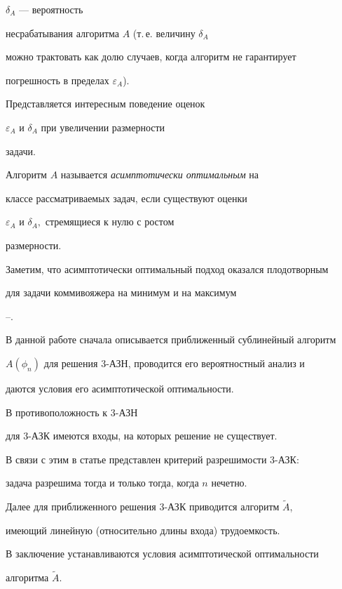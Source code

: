 $\delta_{A}$ --- вероятность 


несрабатывания алгоритма ${A}$ (т.\,е. величину $\delta_{ A}$ 


можно трактовать как долю случаев, когда алгоритм не гарантирует 


погрешность в пределах $\varepsilon_{ A} $).





Представляется интересным поведение оценок 


$\varepsilon_{ A}$ и $\delta_{A}$ при увеличении размерности 


задачи.





Алгоритм ${A}$ называется {\em асимптотически оптимальным} на


классе рассматриваемых задач, если существуют оценки


$\varepsilon_{ A} $ и $\delta_{ A}, $ стремящиеся к нулю с ростом


размерности.


Заметим, что асимптотически оптимальный подход оказался плодотворным


для задачи коммивояжера на минимум и на максимум 


\cite{G88}--\cite{Sl82}.


В данной работе сначала описывается приближенный сублинейный алгоритм


$A(\phi_n)$ для решения 3-АЗН, проводится его вероятностный анализ и


даются условия его асимптотической оптимальности. 





В противоположность к 3-АЗН


для 3-АЗК имеются входы, на которых решение не существует.


В связи с этим в статье представлен критерий разрешимости 3-АЗК:


задача разрешима тогда и только тогда, когда $n$ нечетно.


Далее для приближенного решения 3-АЗК приводится алгоритм $\widetilde A$,


имеющий линейную (относительно длины входа) трудоемкость. 


В заключение устанавливаются условия асимптотической оптимальности 


алгоритма $\widetilde A$.





